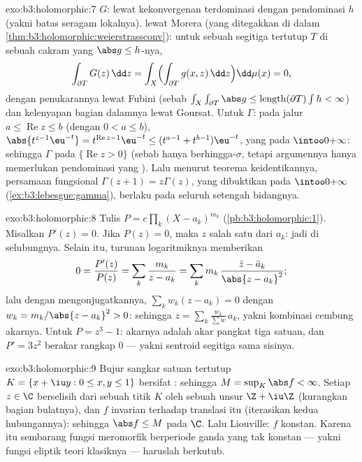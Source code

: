\begin{solution}{exo:b3:holomorphic:7}
 $G$: lewat kekonvergenan terdominasi dengan pendominasi $h$
(yakni batas seragam lokalnya).  lewat Morera (yang ditegakkan
di dalam \cref{thm:b3:holomorphic:weierstrassconv}): untuk sebuah
segitiga tertutup $T$ di sebuah cakram yang $\abs g \leq h$-nya,
\[
\int_{\partial T}G(z)\,\dd z =
\int_X\Bigl(\int_{\partial T}g(x, z)\,\dd z\Bigr)\dd\mu(x) =
0,
\]
dengan penukarannya lewat Fubini (sebab $\int_X\int_{\partial T}\abs
g \leq \operatorname{length}(\partial T)\int h < \infty$) dan
kelenyapan bagian dalamnya lewat Goursat. Untuk $\Gamma$: pada jalur $a
\leq \operatorname{Re}z \leq b$ (dengan $0 < a \leq b$),
$\abs{t^{z-1}\eu^{-t}} = t^{\operatorname{Re}z-1}\eu^{-t} \leq
(t^{a-1} + t^{b-1})\eu^{-t}$, yang  pada
$\intoo0{+\infty}$: sehingga $\Gamma$  pada
$\{\operatorname{Re} z > 0\}$ (sebab  hanya
berhingga-$\sigma$, tetapi argumennya hanya memerlukan pendominasi
yang ). Lalu menurut teorema keidentikannya, persamaan fungsional
$\Gamma(z + 1) = z\Gamma(z)$, yang dibuktikan pada
$\intoo0{+\infty}$ (\cref{ex:b3:lebesgue:gamma}), berlaku pada
seluruh setengah bidangnya.
\end{solution}

\begin{solution}{exo:b3:holomorphic:8}
Tulis $P = c\prod_k(X - a_k)^{m_k}$
(\cref{pb:b3:holomorphic:1}). Misalkan $P'(z) = 0$. Jika $P(z) = 0$,
maka $z$ salah satu dari $a_k$: jadi di selubungnya. Selain itu,
turunan logaritmiknya memberikan
\[
0 = \frac{P'(z)}{P(z)} = \sum_k\frac{m_k}{z - a_k}
= \sum_k m_k\,\frac{\bar z - \bar a_k}{\abs{z - a_k}^2} ;
\]
lalu dengan mengonjugatkannya, $\sum_kw_k(z - a_k) = 0$ dengan $w_k = m_k/\abs{z -
a_k}^2 > 0$: sehingga $z = \sum_k\frac{w_k}{\sum w}\,a_k$, yakni kombinasi
cembung akarnya. Untuk $P = z^3 - 1$: akarnya adalah akar pangkat tiga
satuan, dan $P' = 3z^2$ berakar rangkap $0$ --- yakni
sentroid segitiga sama sisinya.
\end{solution}

\begin{solution}{exo:b3:holomorphic:9}
Bujur sangkar satuan tertutup $K = \{x + \iu y : 0 \leq x, y \leq
1\}$ bersifat : sehingga $M = \sup_K\abs f < \infty$. Setiap $z \in \C$
berselisih dari sebuah titik $K$ oleh sebuah unsur $\Z + \iu\Z$
(kurangkan bagian bulatnya), dan $f$ invarian terhadap
translasi itu (iterasikan kedua hubungannya): sehingga $\abs f \leq M$ pada
$\C$. Lalu Liouville: $f$ konstan. Karena itu sembarang fungsi meromorfik
berperiode ganda yang tak konstan --- yakni fungsi eliptik
teori klasiknya --- haruslah berkutub.
\end{solution}

